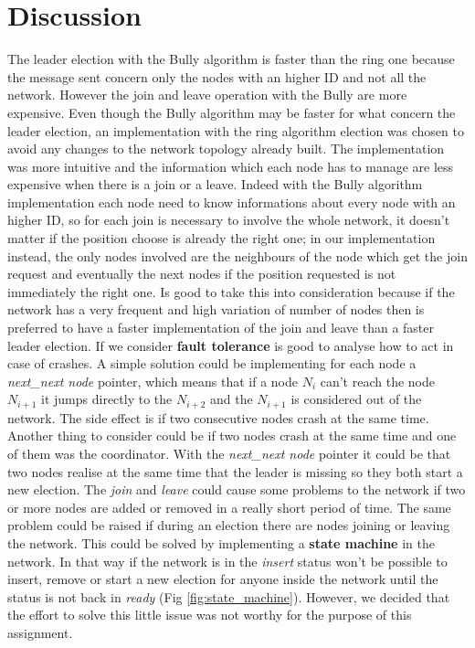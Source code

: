\documentclass[11pt,conference]{IEEEtran}
\begin{document}
\section{Discussion}
The leader election with the Bully algorithm is faster than the ring one because the message sent concern only the nodes with an higher ID and not all the network. However the join and leave operation with the Bully are more expensive.
Even though the Bully algorithm may be faster for what concern the leader election, an implementation with the ring algorithm election was chosen to avoid any changes to the network topology already built. The implementation was more intuitive and the information which each node has to manage are less expensive when there is a join or a leave. Indeed with the Bully algorithm implementation each node need to know informations about every node with an higher ID, so for each join is necessary to involve the whole network, it doesn't matter if the position choose is already the right one; in our implementation instead, the only nodes involved are the neighbours of the node which get the join request and eventually the next nodes if the position requested is not immediately the right one. Is good to take this into consideration because if the network has a very frequent and high variation of number of nodes then is preferred to have a faster implementation of the join and leave than a faster leader election.
\newline
If we consider \textbf{fault tolerance} is good to analyse how to act in case of crashes. A simple solution could be implementing for each node a \textit{next\_next node} pointer, which means that if a node $N_i$ can't reach the node $N_{i+1}$ it jumps directly to the $N_{i+2}$ and the $N_{i+1}$ is considered out of the network. The side effect is if two consecutive nodes crash at the same time. Another thing to consider could be if two nodes crash at the same time and one of them was the coordinator. With the \textit{next\_next node} pointer it could be that two nodes realise at the same time that the leader is missing so they both start a new election.
\newline
The \textit{join} and \textit{leave} could cause some problems to the network if two or more nodes are added or removed in a really short period of time. The same problem could be raised if during an election there are nodes joining or leaving the network. This could be solved by implementing a \textbf{state machine} in the network. In that way if the network is in the \textit{insert} status won't be possible to insert, remove or start a new election for anyone inside the network until the status is not back in \textit{ready} (Fig \ref{fig:state_machine}). However, we decided that the effort to solve this little issue was not worthy for the purpose of this assignment.  
\end{document}
